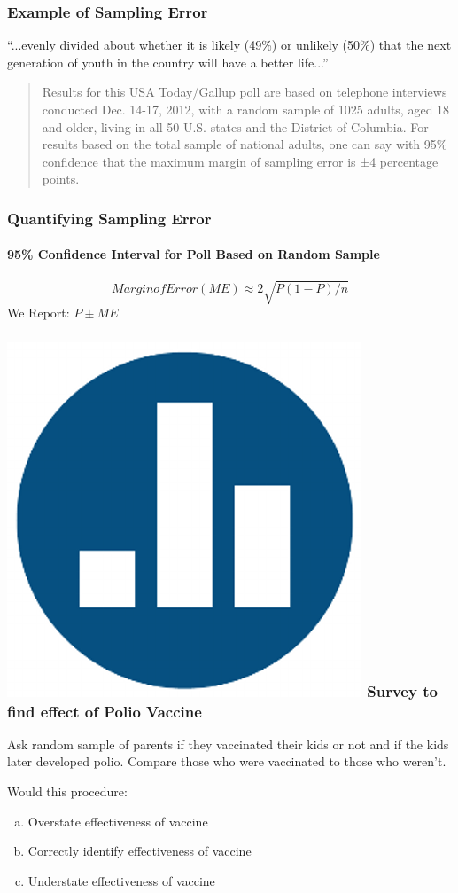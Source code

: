 \documentclass[handout]{beamer}
\begin{document}
\begin{frame}
\frametitle{Example of Sampling Error}
``...evenly divided about whether it is likely (49\%) or unlikely (50\%) that the next generation of youth in the country will have a better life...''

\vspace{2em}
\begin{quote}
Results for this USA Today/Gallup poll are based on telephone interviews conducted Dec. 14-17, 2012, with a \alert{random sample of 1025 adults}, aged 18 and older, living in all 50 U.S. states and the District of Columbia. For results based on the total sample of national adults, one can say with \alert{95\% confidence that the maximum margin of sampling error is ±4 percentage points}.
\end{quote}
\end{frame}
\begin{frame}
\frametitle{Quantifying Sampling Error}
\framesubtitle{95\% Confidence Interval for Poll Based on Random Sample}
	$$Margin of Error (ME) \approx 2 \sqrt{P(1-P)/n}$$
	We Report: $P \pm ME$
\end{frame}

\begin{frame}
\frametitle{\includegraphics[scale = 0.05]{./images/clicker} \hfill Survey to find effect of Polio Vaccine}
Ask random sample of parents if they vaccinated their kids or not and if the kids later developed polio. Compare those who were vaccinated to those who weren't.

\vspace{1em}


Would this procedure:
	\begin{enumerate}[(a)]
		\item Overstate effectiveness of vaccine
		\item Correctly identify effectiveness of vaccine
		\item Understate effectiveness of vaccine
	\end{enumerate}

\end{frame}
\end{document}
